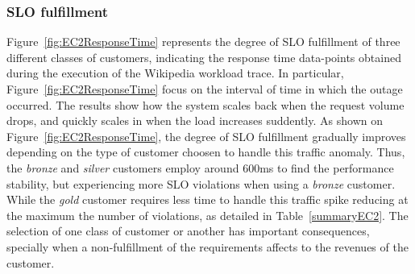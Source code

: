 \subsubsection{SLO fulfillment} 
Figure~\ref{fig:EC2ResponseTime} represents the degree of SLO fulfillment of three different classes of customers, indicating the response time data-points obtained during the execution of the Wikipedia workload trace. In particular, Figure~\ref{fig:EC2ResponseTime} focus on the interval of time in which the outage occurred. The results show how the system scales back when the request volume drops, and quickly scales in when the load increases suddently. As shown on Figure~\ref{fig:EC2ResponseTime},  the degree of SLO fulfillment gradually improves depending on the type of customer choosen to handle this traffic anomaly. Thus, the \emph{bronze} and \emph{silver} customers employ around 600ms to find the performance stability,  but experiencing more SLO violations when using a \emph{bronze} customer. While the \emph{gold} customer requires less time to handle this traffic spike reducing at the maximum the number of violations, as detailed in Table~\ref{summaryEC2}. The selection of one class of customer or another has important consequences, specially when a non-fulfillment of the requirements affects to the revenues of the customer.

